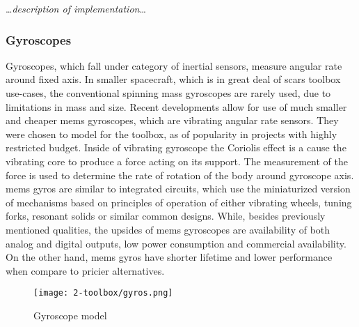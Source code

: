         \dots\textit{description of implementation}\dots

    \subsubsection{Gyroscopes}

        Gyroscopes, which fall under category of inertial sensors, measure angular rate around fixed axis. In smaller spacecraft, which is in great deal of \ac{scars} toolbox use-cases, the conventional spinning mass gyroscopes are rarely used, due to limitations in mass and size. Recent developments allow for use of much smaller and cheaper \ac{mems} gyroscopes, which are vibrating angular rate sensors. They were chosen to model for the toolbox, as of popularity in projects with highly restricted budget. \cite{armenise2010advances} Inside of vibrating gyroscope the Coriolis effect is a cause the vibrating core to produce a force acting on its support. The measurement of the force is used to determine the rate of rotation of the body around gyroscope axis. \ac{mems} gyros are similar to integrated circuits, which use the miniaturized version of mechanisms based on principles of operation of either vibrating wheels, tuning forks, resonant solids or similar common designs. \cite{bernstein2003overview} While, besides previously mentioned qualities, the upsides of \ac{mems} gyroscopes are availability of both analog and digital outputs, low power consumption and commercial availability. On the other hand, \ac{mems} gyros have shorter lifetime and lower performance when compare to pricier alternatives.

        \begin{figure}[H]
            \centering
            \texttt{[image: 2-toolbox/gyros.png]}
            \caption{Gyroscope model}
            \label{fig:gryo_simulink}
        \end{figure}

